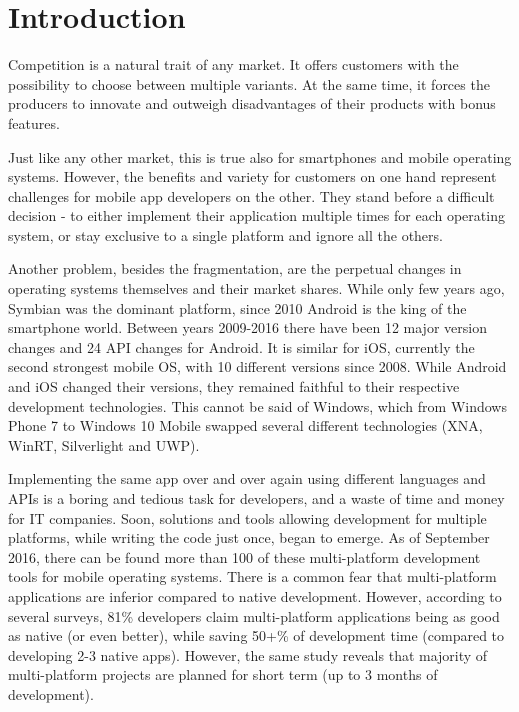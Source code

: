 \documentclass[english,master,public,dept460,male,cpdeclaration,oneside]{diploma}
\begin{document}
\MakeTitlePages

\lstlistoflistings

\section{Introduction}
Competition is a natural trait of any market. It offers customers with the possibility to choose between multiple variants. At the same time, it forces the producers to innovate and outweigh disadvantages of their products with bonus features. 

Just like any other market, this is true also for smartphones and mobile operating systems. However, the benefits and variety for customers on one hand represent challenges for mobile app developers on the other. They stand before a difficult decision - to either implement their application multiple times for each operating system, or stay exclusive to a single platform and ignore all the others.

Another problem, besides the fragmentation, are the perpetual changes in operating systems themselves and their market shares. While only few years ago, Symbian was the dominant platform, since 2010 Android is the king of the smartphone world. Between years 2009-2016 there have been 12 major version changes and 24 API changes for Android. It is similar for iOS, currently the second strongest mobile OS, with 10 different versions since 2008. While Android and iOS changed their versions, they remained faithful to their respective development technologies. This cannot be said of Windows, which from Windows Phone 7 to Windows 10 Mobile swapped several different technologies (XNA, WinRT, Silverlight and UWP).

Implementing the same app over and over again using different languages and APIs is a boring and tedious task for developers, and a waste of time and money for IT companies. Soon, solutions and tools allowing development for multiple platforms, while writing the code just once, began to emerge. As of September 2016, there can be found more than 100 of these multi-platform development tools for mobile operating systems. There is a common fear that multi-platform applications are inferior compared to native development. However, according to several surveys, 81\% developers claim multi-platform applications being as good as native (or even better), while saving 50+\% of development time (compared to developing 2-3 native apps)\cite{cptBenchmarking2014}. However, the same study reveals that majority of multi-platform projects are planned for short term (up to 3 months of development).
\end{document}
